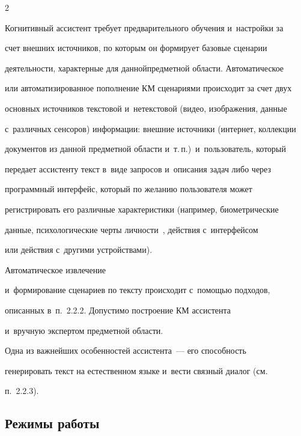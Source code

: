 \begin{multicols}{2}
  


  Когнитивный ассистент требует предварительного обучения и~настройки за 


счет внешних ис\-точников, по которым он формирует базовые сценарии 


деятельности, характерные для данной\linebreak предметной области. Автоматическое 


или автоматизированное пополнение КМ сценариями происходит за счет двух 


основных источников текстовой и~нетекстовой (видео, изображения, данные 


с~различных сенсоров) информации: внешние источники (интернет, коллекции 


документов из данной предметной об\-ласти и~т.\,п.)\ и~пользователь, который 


передает ас\-сис\-тен\-ту текст в~виде запросов и~описания задач либо через 


программный интерфейс, который по желанию пользователя может 


регистрировать его различные характеристики (например, био\-мет\-ри\-че\-ские 


данные, психологические черты лич\-ности~\cite{4-sm}, действия с~интерфейсом 


или действия с~другими устройствами). 





Автоматическое извлечение 


и~формирование сценариев по тексту происходит с~помощью подходов, 


описанных в~п.~2.2.2. До\-пус\-ти\-мо по\-стро\-ение КМ ассистента 


и~вручную экспертом предметной об\-ласти.


  


  Одна из важнейших особенностей ассистента~--- его способность 


генерировать текст на естественном языке и~вести связный диалог (см.\ 


п.~2.2.3).







  


  \subsection{Режимы работы} %



\end{multicols}
